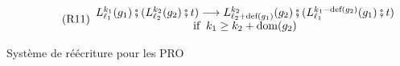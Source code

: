 \documentclass[12pt, a4paper]{article}
\newcommand{\layer}[3]{L^{\smash{#1}}_{\smash{#2}}(#3)}
\begin{document}
\begin{figure}[h]
{\begin{minipage}{0.982\linewidth}
\begin{center}
        \vspace{-0.3em}
        \hspace{-0.8em}
        \begin{subfigure}{0.85\textwidth}
            \begin{equation}\label{ru:layercomctx}\tag{R11}
                \begin{array}{c}
                    \layer{k_1}{\ell_1}{g_1}\fatsemi (\layer{k_2}{\ell_2}{g_2}\fatsemi t) \longrightarrow \layer{k_2}{\ell_2+\textup{def}(g_1)}{g_2}\fatsemi (\layer{k_1-\textup{def}(g_2)}{\ell_1}{g_1}\fatsemi t) \\
                    \text{if}\;\; k_1\ge k_2+\textup{dom}(g_2)
                \end{array}
            \end{equation}
        \end{subfigure}
        \vspace{0.2em}
    \end{center}\end{minipage}}
    \caption{
        \label{fig:pro_rws}
        Système de réécriture pour les PRO
    }
\end{figure}

\newpage
\end{document}
